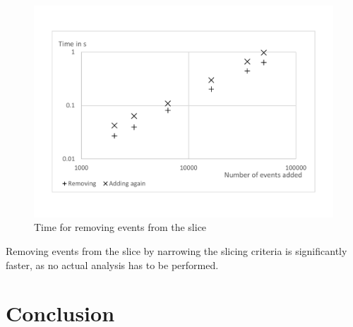 ﻿\documentclass[
      english,
			conference,
      ]{IEEEtran}
\begin{document}
\begin{figure}
	\centering
		\includegraphics[width=\linewidth, clip, trim={20mm 26mm 20mm 26mm}]{chart-rem.pdf}
	\caption{Time for removing events from the slice}
	\label{fig:chartrem}
\end{figure}

Removing events from the slice by narrowing the slicing criteria is significantly faster, as no actual analysis has to be performed.



\section{Conclusion}
\label{sec:conclusion}


\printbibliography
\end{document}

